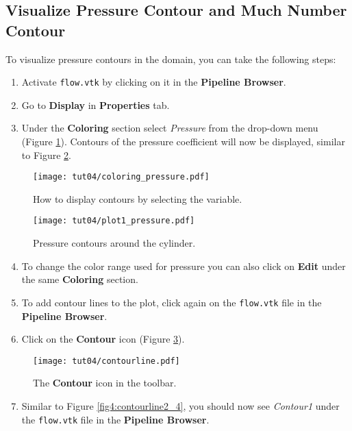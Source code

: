 \subsection{Visualize Pressure Contour and Much Number Contour}
To visualize pressure contours in the domain, you can take the following steps:
\begin{enumerate}[label=\arabic*)]
	\setcounter{enumi}{0}
	\item Activate \texttt{flow.vtk} by clicking on it in the \textbf{Pipeline Browser}.
	\item Go to \textbf{Display} in \textbf{Properties} tab.
	\item Under the \textbf{Coloring} section select \textit{Pressure} from the drop-down menu (Figure \ref{fig4:pressure_coloring_4}). Contours of the pressure coefficient will now be displayed, similar to Figure \ref{fig4:pressure_plot1_4}.
\end{enumerate}
\begin{figure}[ht]
    \centering
    \texttt{[image: tut04/coloring\_pressure.pdf]}
    \caption{How to display contours by selecting the variable.}
    \label{fig4:pressure_coloring_4}
\end{figure}
\begin{figure}[ht]
    \centering
    \texttt{[image: tut04/plot1\_pressure.pdf]}
    \caption{Pressure contours around the cylinder.}
    \label{fig4:pressure_plot1_4}
\end{figure}
\begin{enumerate}[label=\arabic*)]
	\setcounter{enumi}{3}
	\item To change the color range used for pressure you can also click on \textbf{Edit} under the same \textbf{Coloring} section.
	\item To add contour lines to the plot, click again on the \texttt{flow.vtk} file in the \textbf{Pipeline Browser}.
	\item Click on the \textbf{Contour} icon (Figure \ref{fig4:contourline1_4}).
\end{enumerate}
\begin{figure}[H]
    \centering
    \texttt{[image: tut04/contourline.pdf]}
    \caption{The \textbf{Contour} icon in the toolbar.}
    \label{fig4:contourline1_4}
\end{figure}
\begin{enumerate}[label=\arabic*)]
	\setcounter{enumi}{6}
	\item Similar to Figure \ref{fig4:contourline2_4}, you should now see \textit{Contour1} under the \texttt{flow.vtk} file in the \textbf{Pipeline Browser}.
\end{enumerate}
